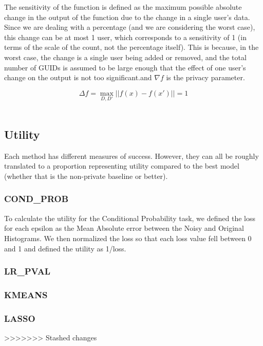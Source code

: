 \documentclass[12pt,letterpaper]{article}
\begin{document}
\begin{table}[h]
The sensitivity of the function is defined as the maximum possible absolute change in the output of the function due to the change in a single user's data. Since we are dealing with a percentage (and we are considering the worst case), this change can be at most 1 user, which corresponds to a sensitivity of 1 (in terms of the scale of the count, not the percentage itself). This is because, in the worst case, the change is a single user being added or removed, and the total number of GUIDs is assumed to be large enough that the effect of one user's change on the output is not too significant.and $\nabla f$ is the privacy parameter. 
\begin{center}
$$\Delta f = \max_{D, D'} ||f(x) - f(x')|| = 1$$ \\
\end{center}

\subsection{Utility}

Each method has different measures of success. However, they can all be roughly translated to a proportion representing utility compared to the best model (whether that is the non-private baseline or better). 

\subsubsection{COND\_PROB}

To calculate the utility for the Conditional Probability task, we defined the loss for each epsilon as the Mean Absolute error between the Noisy and Original Histograms. We then normalized the loss so that each loss value fell between 0 and 1 and defined the utility as 1/loss. 

\subsubsection{LR\_PVAL}
\subsubsection{KMEANS}
\subsubsection{LASSO}


>>>>>>> Stashed changes




\end{table}
\end{document}
